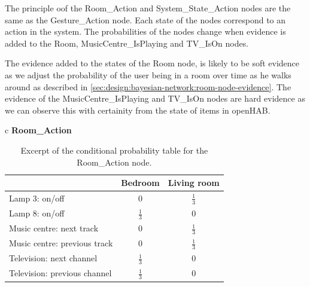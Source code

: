 The principle oof the Room\_Action and System\_State\_Action nodes are the same as the Gesture\_Action node. Each state of the nodes correspond to an action in the system. The probabilities of the nodes change when evidence is added to the Room, MusicCentre\_IsPlaying and TV\_IsOn nodes.

The evidence added to the states of the Room node, is likely to be soft evidence as we adjust the probability of the user being in a room over time as he walks around as described in \cref{sec:design:bayesian-network:room-node-evidence}. The evidence of the MusicCentre\_IsPlaying and TV\_IsOn nodes are hard evidence as we can observe this with certainity from the state of items in openHAB.

\begin{table}[h!]
\centering
\caption{Excerpt of the conditional probability table for the Room\_Action node.}
\label{tbl:design:bayesian-network:cpt-room-action}
\begin{tabular}{c}
\textbf{Room\_Action}   \\
\begin{tabular}{l|cc}
                             & Bedroom & Living room \\ \hline
Lamp 3: on/off               & 0 & $\frac{1}{3}$ \\
Lamp 8: on/off               & $\frac{1}{3}$ & 0 \\
Music centre: next track     & 0   & $\frac{1}{3}$ \\
Music centre: previous track & 0    & $\frac{1}{3}$ \\
Television: next channel     & $\frac{1}{3}$   & 0  \\
Television: previous channel & $\frac{1}{3}$   & 0  \\
\end{tabular}
\end{tabular}
\end{table}


